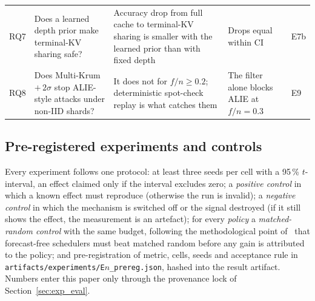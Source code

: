 \documentclass[11pt,a4paper]{article}
\begin{document}
\begin{table}[ht!]
{\begin{tabular}{@{}lp{4.0cm}p{5.2cm}p{4.6cm}l@{}}
RQ7 & Does a learned depth prior make terminal-KV sharing safe?~\cite{loopedfp2026} & Accuracy drop from full cache to terminal-KV sharing is smaller with the learned prior than with fixed depth & Drops equal within CI & E7b \\
RQ8 & Does Multi-Krum $+\,2\sigma$ stop ALIE-style attacks under non-IID shards? & It does not for $f/n \ge 0.2$; deterministic spot-check replay is what catches them & The filter alone blocks ALIE at $f/n=0.3$ & E9 \\
\bottomrule
\end{tabular}%
}
\end{table}

\subsection{Pre-registered experiments and controls}

Every experiment follows one protocol: at least three seeds per cell with a 95\,\% $t$-interval, an effect claimed only if the interval excludes zero; a \emph{positive control} in which a known effect must reproduce (otherwise the run is invalid); a \emph{negative control} in which the mechanism is switched off or the signal destroyed (if it still shows the effect, the measurement is an artefact); for every \emph{policy} a \emph{matched-random control} with the same budget, following the methodological point of~\cite{twelftree2026wadiloco} that forecast-free schedulers must beat matched random before any gain is attributed to the policy; and pre-registration of metric, cells, seeds and acceptance rule in \texttt{artifacts/experiments/E$n$\_prereg.json}, hashed into the result artifact. Numbers enter this paper only through the provenance lock of Section~\ref{sec:exp_eval}.
\end{document}
